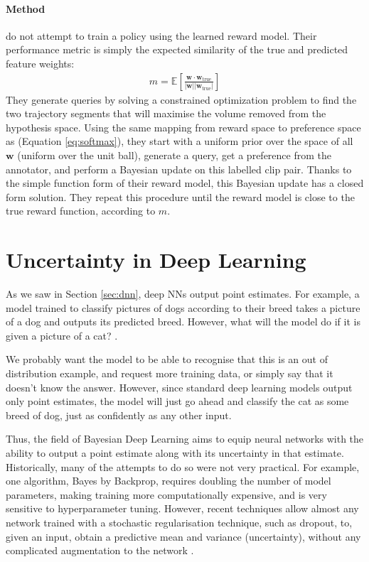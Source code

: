 \documentclass[11pt, a4paper, bibliography=totoc]{report}
\newcommand{\w}{\mathbf{w}}
\begin{document}
\subsubsection{Method}
\cite{Byk2017} do not attempt to train a policy using the learned reward model. Their performance metric is simply the expected similarity of the true and predicted feature weights:
\begin{align*}
m = \mathbb{E}\left[  \frac{\w \cdot \w_\text{true}}{\vert \w \vert \vert \w_\text{true} \vert}  \right]
\end{align*}
They generate queries by solving a constrained optimization problem to find the two trajectory segments that will maximise the volume removed from the hypothesis space. Using the same mapping from reward space to preference space as \cite{Christiano2017} (Equation \ref{eq:softmax}), they start with a uniform prior over the space of all $ \w $ (uniform over the unit ball), generate a query, get a preference from the annotator, and perform a Bayesian update on this labelled clip pair. Thanks to the simple function form of their reward model, this Bayesian update has a closed form solution. They repeat this procedure until the reward model is close to the true reward function, according to $ m $.

\chapter{Uncertainty in Deep Learning}
As we saw in Section \ref{sec:dnn}, deep NNs output point estimates. %
For example, a model trained to classify pictures of dogs according to their breed takes a picture of a dog and outputs its predicted breed. However, what will the model do if it is given a picture of a cat? \cite{Gal2017a}.

We probably want the model to be able to recognise that this is an out of distribution example, and request more training data, or simply say that it doesn't know the answer. However, since standard deep learning models output only point estimates, the model will just go ahead and classify the cat as some breed of dog, just as confidently as any other input.

Thus, the field of Bayesian Deep Learning aims to equip neural networks with the ability to output a point estimate along with its uncertainty in that estimate. Historically, many of the attempts to do so were not very practical. For example, one algorithm, Bayes by Backprop, requires doubling the number of model parameters, making training more computationally expensive, and is very sensitive to hyperparameter tuning. However, recent techniques allow almost any network trained with a stochastic regularisation technique, such as dropout, to, given an input, obtain a predictive mean and variance (uncertainty), without any complicated augmentation to the network \cite[p.~15]{Gal2017a}.
\end{document}
